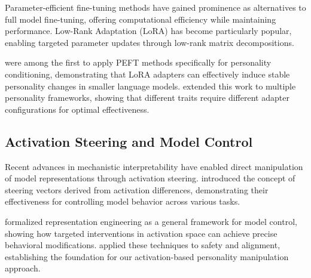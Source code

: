Parameter-efficient fine-tuning methods have gained prominence as alternatives to full model fine-tuning, offering computational efficiency while maintaining performance. Low-Rank Adaptation (LoRA) \citep{hu-etal-2022-lora} has become particularly popular, enabling targeted parameter updates through low-rank matrix decompositions.

\citet{zhang-etal-2023-peft-personality} were among the first to apply PEFT methods specifically for personality conditioning, demonstrating that LoRA adapters can effectively induce stable personality changes in smaller language models. \citet{chen-etal-2023-adapter-personality} extended this work to multiple personality frameworks, showing that different traits require different adapter configurations for optimal effectiveness.

\subsection{Activation Steering and Model Control}

Recent advances in mechanistic interpretability have enabled direct manipulation of model representations through activation steering. \citet{turner-etal-2023-activation-steering} introduced the concept of steering vectors derived from activation differences, demonstrating their effectiveness for controlling model behavior across various tasks.

\citet{li-etal-2023-representation-engineering} formalized representation engineering as a general framework for model control, showing how targeted interventions in activation space can achieve precise behavioral modifications. \citet{zou-etal-2023-representation-engineering-safety} applied these techniques to safety and alignment, establishing the foundation for our activation-based personality manipulation approach.
